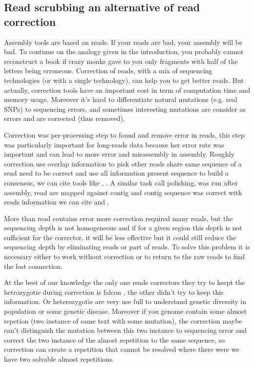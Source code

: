 \documentclass[main.tex]{subfiles}
\begin{document}
\subsection{Read scrubbing an alternative of read correction}

Assembly tools are based on reads. If your reads are bad, your assembly will be bad. To continue on the analogy given in the introduction, you probably cannot reconstruct a book if crazy monks gave to you only fragments with half of the letters being erroneous. Correction of reads, with a mix of sequencing technologies (or with a single technology), can help you to get better reads. But actually, correction tools have an important cost in term of computation time and memory usage. Moreover it's hard to differentiate natural mutations (e.g. real SNPs) to sequencing errors, and sometimes interesting mutations are consider as errors and are corrected (thus removed).

Correction was per-processing step to found and remove error in reads, this step was particularly important for long-reads data because her error rate was important and can lead to more error and misassembly in assembly. Roughly correction use overlap information to pick other reads share same sequence of a read need to be correct and use all information present sequence to build a consensus, we can cite tools like \cite{MECAT}, \cite{CONSENT}. A similar task call polishing, was run after assembly, read are mapped against contig and contig sequence was correct with reads information we can site \cite{racon} and .

More than read contains error more correction required many reads, but the sequencing depth is not homogeneous and if for a given region this depth is not sufficient for the corrector, it will be less effective but it could still reduce the sequencing depth by eliminating reads or part of reads. To solve this problem it is necessary either to work without correction or to return to the raw reads to find the lost connection.

At the best of our knowledge the only one reads correctors they try to keept the hetrozygotie during correction is falcon \cite{falcon}, the other didn't try to keep this information. Or heterozygotie are very use full to understand genetic diversity in population or some genetic disease.
Moreover if you genome contain some almost repetion (two instance of same text with some mutation), the correction maybe can't distinguish the mutation between this two instance to sequencing error and correct the two instance of the almost repetition to the same sequence, so correction can create a repetition that cannot be resolved where there were we have two solvable almost repetitions.
\end{document}
